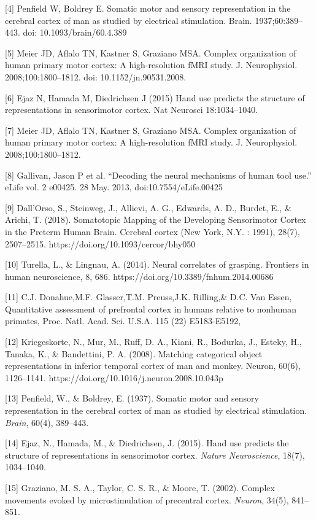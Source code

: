 \documentclass{article}
\begin{document}
[4] Penfield W, Boldrey E. Somatic motor and sensory representation in the cerebral cortex of man as studied by electrical stimulation. Brain. 1937;60:389–443. doi: 10.1093/brain/60.4.389

[5] Meier JD, Aflalo TN, Kastner S, Graziano MSA. Complex organization of human primary motor cortex: A high-resolution fMRI study. J. Neurophysiol. 2008;100:1800–1812. doi: 10.1152/jn.90531.2008.

[6] Ejaz N, Hamada M, Diedrichsen J (2015) Hand use predicts the structure of representations in sensorimotor cortex. Nat Neurosci 18:1034–1040.

[7] Meier JD, Aflalo TN, Kastner S, Graziano MSA. Complex organization of human primary motor cortex: A high-resolution fMRI study. J. Neurophysiol. 2008;100:1800–1812.

[8] Gallivan, Jason P et al. “Decoding the neural mechanisms of human tool use.” eLife vol. 2 e00425. 28 May. 2013, doi:10.7554/eLife.00425

[9] Dall'Orso, S., Steinweg, J., Allievi, A. G., Edwards, A. D., Burdet, E., \& Arichi, T. (2018). Somatotopic Mapping of the Developing Sensorimotor Cortex in the Preterm Human Brain. Cerebral cortex (New York, N.Y. : 1991), 28(7), 2507–2515. https://doi.org/10.1093/cercor/bhy050

[10] Turella, L., \& Lingnau, A. (2014). Neural correlates of grasping. Frontiers in human neuroscience, 8, 686. https://doi.org/10.3389/fnhum.2014.00686

[11] C.J. Donahue,M.F. Glasser,T.M. Preuss,J.K. Rilling,\& D.C. Van Essen,  Quantitative assessment of prefrontal cortex in humans relative to nonhuman primates, Proc. Natl. Acad. Sci. U.S.A. 115 (22) E5183-E5192,

[12] Kriegeskorte, N., Mur, M., Ruff, D. A., Kiani, R., Bodurka, J., Esteky, H., Tanaka, K., \& Bandettini, P. A. (2008). Matching categorical object representations in inferior temporal cortex of man and monkey. Neuron, 60(6), 1126–1141. https://doi.org/10.1016/j.neuron.2008.10.043p

[13] Penfield, W., \& Boldrey, E. (1937). Somatic motor and sensory representation in the cerebral cortex of man as studied by electrical stimulation. \textit{Brain}, 60(4), 389–443.

[14] Ejaz, N., Hamada, M., \& Diedrichsen, J. (2015). Hand use predicts the structure of representations in sensorimotor cortex. \textit{Nature Neuroscience}, 18(7), 1034–1040.

[15] Graziano, M. S. A., Taylor, C. S. R., \& Moore, T. (2002). Complex movements evoked by microstimulation of precentral cortex. \textit{Neuron}, 34(5), 841–851.
\end{document}
